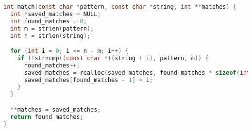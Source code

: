 \begin{lstlisting}[language=C,caption={C naive implementation},label={lst:naive_c}]
int match(const char *pattern, const char *string, int **matches) {
  int *saved_matches = NULL;
  int found_matches = 0;
  int m = strlen(pattern);
  int n = strlen(string);

  for (int i = 0; i <= n - m; i++) {
    if (!strncmp((const char *)(string + i), pattern, m)) {
      found_matches++;
      saved_matches = realloc(saved_matches, found_matches * sizeof(int));
      saved_matches[found_matches - 1] = i;
    }
  }

  **matches = saved_matches;
  return found_matches;
}
\end{lstlisting}
